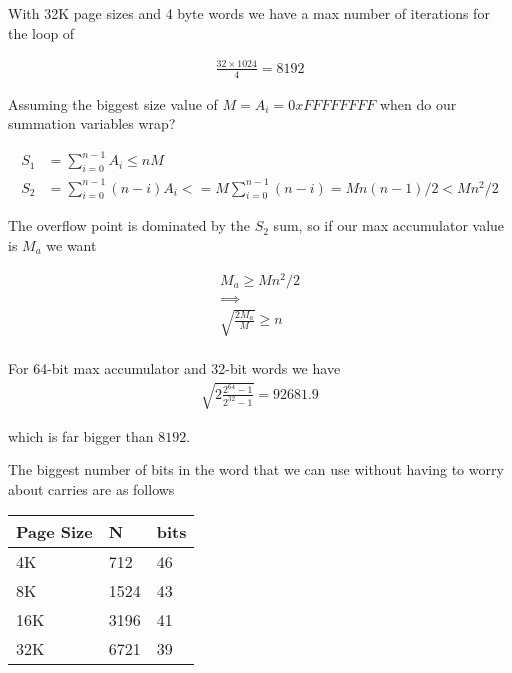With 32K page sizes and 4 byte words we have a max number of iterations for the loop of

\begin{align*}
\frac{32 \times 1024 }{4} = 8192 
\end{align*}

Assuming the biggest size value of $M = A_i = 0xFFFFFFFF$ when do our summation variables wrap?

\begin{align*}
S_1 &= \sum_{i=0}^{n-1} A_i \le n M \\
S_2 &= \sum_{i=0}^{n-1} (n-i)A_i <= M \sum_{i=0}^{n-1} (n-i) = M n(n-1)/2 < M n^2/2
\end{align*}

The overflow point is dominated by the $S_2$ sum, so if our max accumulator value is $M_a$ we want

\begin{align*}
M_a \ge M n^2/2 \\
\implies \\
\sqrt{\frac{ 2 M_a }{ M}} \ge n \\
\end{align*}

For 64-bit max accumulator and 32-bit words we have
\begin{align*}
\sqrt{2 \frac{2^{64} - 1}{2^{32} - 1}} = 92 681.9
\end{align*}

which is far bigger than $8192$.


The biggest number of bits in the word that we can use without having to worry about carries are as follows

\begin{tabular}{|l|l|l|}
\hline
Page Size & N & bits \\
\hline
4K & 712 & 46 \\
8K & 1524 & 43 \\
16K & 3196 & 41 \\
32K & 6721 & 39 \\
\hline
\end{tabular}


%

%
%

%
